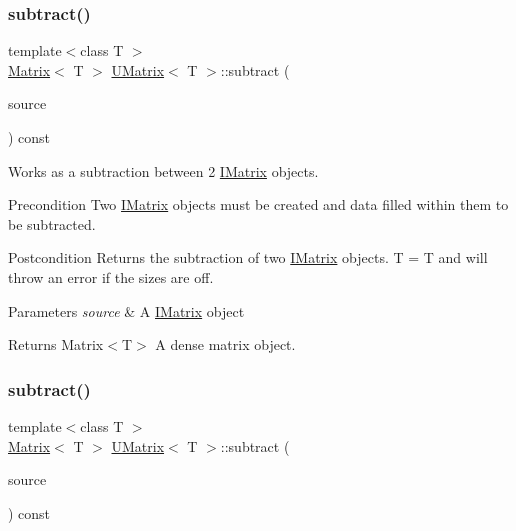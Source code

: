 \subsubsection{\texorpdfstring{subtract()}{subtract()}\hspace{0.1cm}{\footnotesize\ttfamily [3/6]}}
{\footnotesize\ttfamily template$<$class T $>$ \\
\mbox{\hyperlink{class_matrix}{Matrix}}$<$ T $>$ \mbox{\hyperlink{class_u_matrix}{U\+Matrix}}$<$ T $>$\+::subtract (\begin{DoxyParamCaption}\item[{const \mbox{\hyperlink{class_i_matrix}{I\+Matrix}}$<$ \mbox{\hyperlink{class_l_matrix}{L\+Matrix}}$<$ T $>$, T $>$ \&}]{source }\end{DoxyParamCaption}) const}



Works as a subtraction between 2 \mbox{\hyperlink{class_i_matrix}{I\+Matrix}} objects. 

\begin{DoxyPrecond}{Precondition}
Two \mbox{\hyperlink{class_i_matrix}{I\+Matrix}} objects must be created and data filled within them to be subtracted. 
\end{DoxyPrecond}
\begin{DoxyPostcond}{Postcondition}
Returns the subtraction of two \mbox{\hyperlink{class_i_matrix}{I\+Matrix}} objects. T = T and will throw an error if the sizes are off.
\end{DoxyPostcond}

\begin{DoxyParams}{Parameters}
{\em source} & A \mbox{\hyperlink{class_i_matrix}{I\+Matrix}} object \\
\hline
\end{DoxyParams}
\begin{DoxyReturn}{Returns}
Matrix$<$\+T$>$ A dense matrix object. 
\end{DoxyReturn}
\mbox{\label{class_u_matrix_a1f16f054b4df60b40751ca260983c2c5}} 
\subsubsection{\texorpdfstring{subtract()}{subtract()}\hspace{0.1cm}{\footnotesize\ttfamily [4/6]}}
{\footnotesize\ttfamily template$<$class T $>$ \\
\mbox{\hyperlink{class_matrix}{Matrix}}$<$ T $>$ \mbox{\hyperlink{class_u_matrix}{U\+Matrix}}$<$ T $>$\+::subtract (\begin{DoxyParamCaption}\item[{const \mbox{\hyperlink{class_i_matrix}{I\+Matrix}}$<$ \mbox{\hyperlink{class_u_matrix}{U\+Matrix}}$<$ T $>$, T $>$ \&}]{source }\end{DoxyParamCaption}) const\hspace{0.3cm}{\ttfamily [virtual]}}



